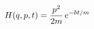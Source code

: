 \documentclass[preview]{standalone}
\begin{document}
\begin{align*}
\special{dvisvgm:raw <g id='unique000'>}H(q,p,t) = \frac{p^2}{2m}\,e^{-bt/m}\special{dvisvgm:raw </g>}
\end{align*}
\end{document}
